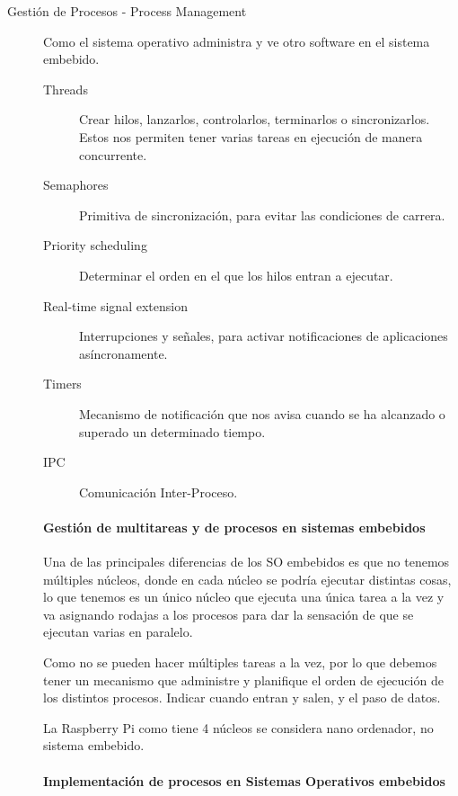 \documentclass[12pt, twoside, openright]{report} %
\begin{document}
\begin{description}
	\item[Gestión de Procesos - Process Management] Como el sistema operativo administra y ve otro software en el sistema embebido.

	      \begin{description}
		      \item[Threads] Crear hilos, lanzarlos, controlarlos, terminarlos o sincronizarlos. Estos nos permiten tener varias tareas en ejecución de manera concurrente.
		      \item[Semaphores] Primitiva de sincronización, para evitar las condiciones de carrera.
		      \item[Priority scheduling] Determinar el orden en el que los hilos entran a ejecutar.
		      \item[Real-time signal extension] Interrupciones y señales, para activar notificaciones de aplicaciones asíncronamente.
		      \item[Timers] Mecanismo de notificación que nos avisa cuando se ha alcanzado o superado un determinado tiempo.
		      \item[IPC] Comunicación Inter-Proceso.
	      \end{description}

	      \paragraph{Gestión de multitareas y de procesos en sistemas embebidos}

	      Una de las principales diferencias de los SO embebidos es que no tenemos múltiples núcleos, donde en cada núcleo se podría ejecutar distintas cosas, lo que tenemos es un único núcleo que ejecuta una única tarea a la vez y va asignando rodajas a los procesos para dar la sensación de que se ejecutan varias en paralelo.

	      Como no se pueden hacer múltiples tareas a la vez, por lo que debemos tener un mecanismo que administre y planifique el orden de ejecución de los distintos procesos. Indicar cuando entran y salen, y el paso de datos.

	      La Raspberry Pi como tiene 4 núcleos se considera nano ordenador, no sistema embebido.


	      \paragraph{Implementación de procesos en Sistemas Operativos embebidos}


\end{description}
\end{document}

